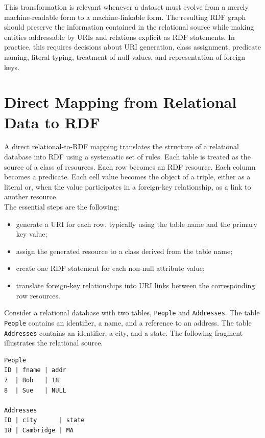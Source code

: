 \documentclass{scrbook}
\begin{document}
	This transformation is relevant whenever a dataset must evolve from a merely machine-readable form to a machine-linkable form. The resulting RDF graph should preserve the information contained in the relational source while making entities addressable by URIs and relations explicit as RDF statements. In practice, this requires decisions about URI generation, class assignment, predicate naming, literal typing, treatment of null values, and representation of foreign keys.
	
	\section{Direct Mapping from Relational Data to RDF}
	
	A direct relational-to-RDF mapping translates the structure of a relational database into RDF using a systematic set of rules. Each table is treated as the source of a class of resources. Each row becomes an RDF resource. Each column becomes a predicate. Each cell value becomes the object of a triple, either as a literal or, when the value participates in a foreign-key relationship, as a link to another resource.\\
	
	The essential steps are the following:
	
	\begin{itemize}
	    \item generate a URI for each row, typically using the table name and the primary key value;
	    \item assign the generated resource to a class derived from the table name;
	    \item create one RDF statement for each non-null attribute value;
	    \item translate foreign-key relationships into URI links between the corresponding row resources.
	\end{itemize}
	
	Consider a relational database with two tables, \texttt{People} and \texttt{Addresses}. The table \texttt{People} contains an identifier, a name, and a reference to an address. The table \texttt{Addresses} contains an identifier, a city, and a state. The following fragment illustrates the relational source.
	
	\begin{lstlisting}
People
ID | fname | addr
7  | Bob   | 18
8  | Sue   | NULL

Addresses
ID | city      | state
18 | Cambridge | MA
	\end{lstlisting}
	
\end{document}
